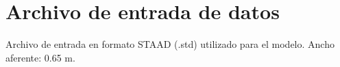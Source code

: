 \documentclass[12pt,a4paper]{article}
\begin{document}
\vspace{1.5cm}
\begin{center}
\end{center}

\appendix
\section{Archivo de entrada de datos}

{
\sffamily\small
Archivo de entrada en formato STAAD (.std) utilizado para el modelo.
Ancho aferente: 0.65 m.
}

\vspace{0.3cm}
{\scriptsize\ttfamily

}
\end{document}
